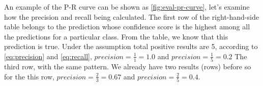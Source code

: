 
An example of the P-R curve can be shown as \autoref{fig:eval-pr-curve}, let's
examine how the precision and recall being calculated. The first row of the
right-hand-side table belongs to the prediction whose confidence score is the
highest among all the predictions for a particular class. From the table, we
know that this prediction is true.
Under the assumption total positive results are 5,
according to \autoref{eq:precision} and \autoref{eq:recall},
$precision = \frac{1}{1}=1.0$ and $precision = \frac{1}{5}=0.2$
The third row, with the same pattern. We already have two results (rows) before
so for the this row,
$precision = \frac{2}{3}=0.67$ and $precision = \frac{2}{5}=0.4$.

